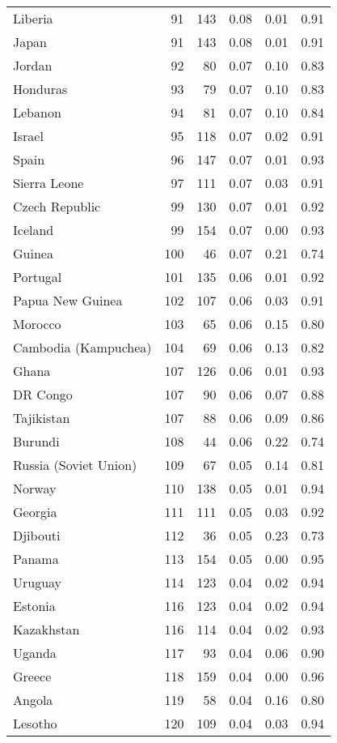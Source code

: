 \begin{longtable}[t]{lrrrrr}
Liberia & 91 & 143 & 0.08 & 0.01 & 0.91\\
\addlinespace
Japan & 91 & 143 & 0.08 & 0.01 & 0.91\\
Jordan & 92 & 80 & 0.07 & 0.10 & 0.83\\
Honduras & 93 & 79 & 0.07 & 0.10 & 0.83\\
Lebanon & 94 & 81 & 0.07 & 0.10 & 0.84\\
Israel & 95 & 118 & 0.07 & 0.02 & 0.91\\
\addlinespace
Spain & 96 & 147 & 0.07 & 0.01 & 0.93\\
Sierra Leone & 97 & 111 & 0.07 & 0.03 & 0.91\\
Czech Republic & 99 & 130 & 0.07 & 0.01 & 0.92\\
Iceland & 99 & 154 & 0.07 & 0.00 & 0.93\\
Guinea & 100 & 46 & 0.07 & 0.21 & 0.74\\
\addlinespace
Portugal & 101 & 135 & 0.06 & 0.01 & 0.92\\
Papua New Guinea & 102 & 107 & 0.06 & 0.03 & 0.91\\
Morocco & 103 & 65 & 0.06 & 0.15 & 0.80\\
Cambodia (Kampuchea) & 104 & 69 & 0.06 & 0.13 & 0.82\\
Ghana & 107 & 126 & 0.06 & 0.01 & 0.93\\
\addlinespace
DR Congo & 107 & 90 & 0.06 & 0.07 & 0.88\\
Tajikistan & 107 & 88 & 0.06 & 0.09 & 0.86\\
Burundi & 108 & 44 & 0.06 & 0.22 & 0.74\\
Russia (Soviet Union) & 109 & 67 & 0.05 & 0.14 & 0.81\\
Norway & 110 & 138 & 0.05 & 0.01 & 0.94\\
\addlinespace
Georgia & 111 & 111 & 0.05 & 0.03 & 0.92\\
Djibouti & 112 & 36 & 0.05 & 0.23 & 0.73\\
Panama & 113 & 154 & 0.05 & 0.00 & 0.95\\
Uruguay & 114 & 123 & 0.04 & 0.02 & 0.94\\
Estonia & 116 & 123 & 0.04 & 0.02 & 0.94\\
\addlinespace
Kazakhstan & 116 & 114 & 0.04 & 0.02 & 0.93\\
Uganda & 117 & 93 & 0.04 & 0.06 & 0.90\\
Greece & 118 & 159 & 0.04 & 0.00 & 0.96\\
Angola & 119 & 58 & 0.04 & 0.16 & 0.80\\
Lesotho & 120 & 109 & 0.04 & 0.03 & 0.94\\

\end{longtable}
